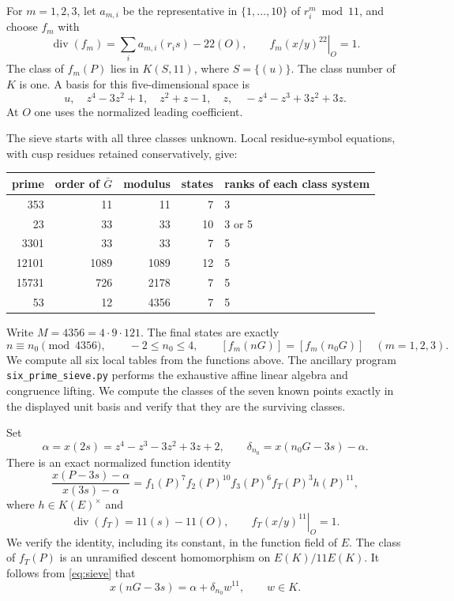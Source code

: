 \documentclass[11pt,reqno]{amsart}
\theoremstyle{definition}\newtheorem{definition}[theorem]{Definition}
\theoremstyle{remark}\newtheorem{remark}[theorem]{Remark}
\numberwithin{equation}{section}
\begin{document}
For \(m=1,2,3\), let \(a_{m,i}\) be the representative in
\(\{1,\ldots,10\}\) of \(r_i^m\bmod11\), and choose \(f_m\) with
\[
 \operatorname{div}(f_m)=\sum_i a_{m,i}(r_i s)-22(O),
 \qquad \left.f_m(x/y)^{22}\right|_O=1.
\]
The class of \(f_m(P)\) lies in \(K(S,11)\), where
\(S=\{(u)\}\). The class number of \(K\) is one. A basis for this
five-dimensional space is
\[
 u,\quad z^4-3z^2+1,\quad z^2+z-1,\quad z,
 \quad -z^4-z^3+3z^2+3z.
\]
At \(O\) one uses the normalized leading coefficient. 

The sieve starts with all three classes unknown. Local residue-symbol
equations, with cusp residues retained conservatively, give:
\begin{center}\begin{tabular}{rrrrl}\toprule
prime&order of \(\bar G\)&modulus&states&ranks of each class system\\\midrule
353&11&11&7&3\\
23&33&33&10&3 or 5\\
3301&33&33&7&5\\
12101&1089&1089&12&5\\
15731&726&2178&7&5\\
53&12&4356&7&5\\\bottomrule
\end{tabular}\end{center}
Write \(M=4356=4\cdot9\cdot121\). The final states are exactly
\begin{equation}\label{eq:sieve}
 n\equiv n_0\pmod{4356},\qquad -2\le n_0\le4,
 \qquad [f_m(nG)]=[f_m(n_0G)]\quad(m=1,2,3).
\end{equation}
We compute all six local tables from the functions above.
The ancillary program \texttt{six\_prime\_sieve.py} performs the exhaustive affine
linear algebra and congruence lifting.
We compute the classes of the seven known points exactly in the displayed
unit basis and verify that they are the surviving classes.

Set
\[
 \alpha=x(2s)=z^4-z^3-3z^2+3z+2,\qquad
 \delta_{n_0}=x(n_0G-3s)-\alpha.
\]
There is an exact normalized function identity
\[
 \frac{x(P-3s)-\alpha}{x(3s)-\alpha}
   = f_1(P)^7 f_2(P)^{10} f_3(P)^6 f_T(P)^3 h(P)^{11},
\]
where \(h\in K(E)^\times\) and
\[
 \operatorname{div}(f_T)=11(s)-11(O),\qquad
 \left.f_T(x/y)^{11}\right|_O=1.
\]
We verify the identity, including its constant, in the function field
of \(E\). The class of \(f_T(P)\) is an
unramified descent homomorphism on \(E(K)/11E(K)\).
It follows from \eqref{eq:sieve} that
\begin{equation}\label{eq:cusp}
 x(nG-3s)=\alpha+\delta_{n_0}w^{11},\qquad w\in K.
\end{equation}
\end{document}
